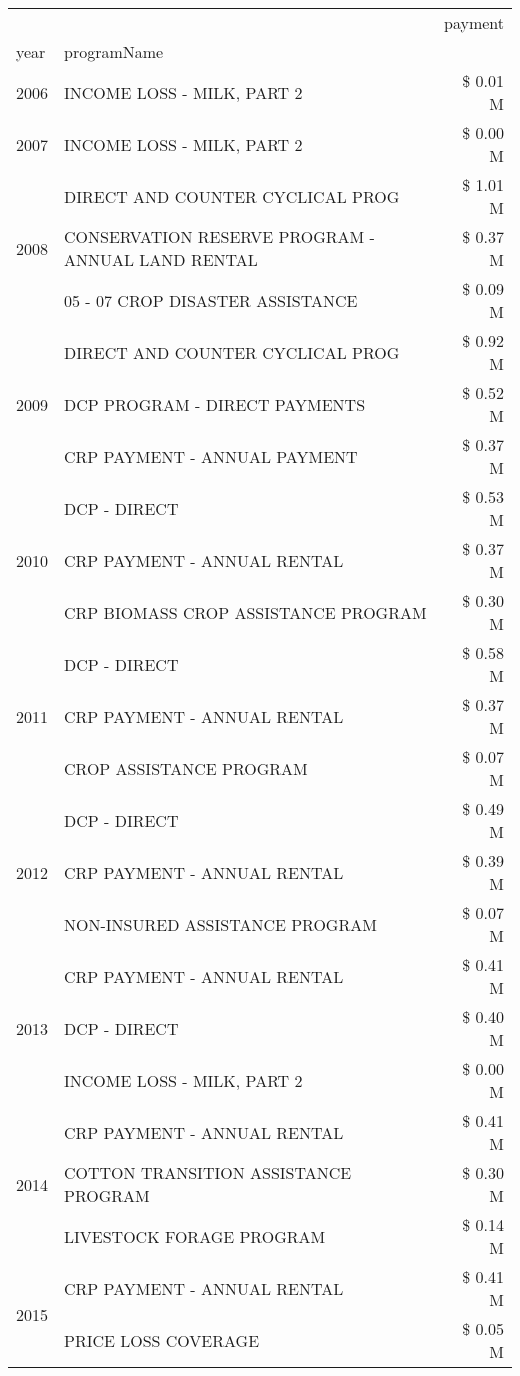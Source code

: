 \begin{tabular}{llr}
\toprule
 &  & payment \\
year & programName &  \\
\midrule
2006 & INCOME LOSS - MILK, PART 2 & \$ 0.01 M \\
\cline{1-3}
2007 & INCOME LOSS - MILK, PART 2 & \$ 0.00 M \\
\cline{1-3}
\multirow[t]{3}{*}{2008} & DIRECT AND COUNTER CYCLICAL PROG & \$ 1.01 M \\
 & CONSERVATION RESERVE PROGRAM - ANNUAL LAND RENTAL & \$ 0.37 M \\
 & 05 - 07 CROP DISASTER ASSISTANCE & \$ 0.09 M \\
\cline{1-3}
\multirow[t]{3}{*}{2009} & DIRECT AND COUNTER CYCLICAL PROG & \$ 0.92 M \\
 & DCP PROGRAM - DIRECT PAYMENTS & \$ 0.52 M \\
 & CRP PAYMENT - ANNUAL PAYMENT & \$ 0.37 M \\
\cline{1-3}
\multirow[t]{3}{*}{2010} & DCP - DIRECT & \$ 0.53 M \\
 & CRP PAYMENT - ANNUAL RENTAL & \$ 0.37 M \\
 & CRP BIOMASS CROP ASSISTANCE PROGRAM & \$ 0.30 M \\
\cline{1-3}
\multirow[t]{3}{*}{2011} & DCP - DIRECT & \$ 0.58 M \\
 & CRP PAYMENT - ANNUAL RENTAL & \$ 0.37 M \\
 & CROP ASSISTANCE PROGRAM & \$ 0.07 M \\
\cline{1-3}
\multirow[t]{3}{*}{2012} & DCP - DIRECT & \$ 0.49 M \\
 & CRP PAYMENT - ANNUAL RENTAL & \$ 0.39 M \\
 & NON-INSURED ASSISTANCE PROGRAM & \$ 0.07 M \\
\cline{1-3}
\multirow[t]{3}{*}{2013} & CRP PAYMENT - ANNUAL RENTAL & \$ 0.41 M \\
 & DCP - DIRECT & \$ 0.40 M \\
 & INCOME LOSS - MILK, PART 2 & \$ 0.00 M \\
\cline{1-3}
\multirow[t]{3}{*}{2014} & CRP PAYMENT - ANNUAL RENTAL & \$ 0.41 M \\
 & COTTON TRANSITION ASSISTANCE PROGRAM & \$ 0.30 M \\
 & LIVESTOCK FORAGE PROGRAM & \$ 0.14 M \\
\cline{1-3}
\multirow[t]{3}{*}{2015} & CRP PAYMENT - ANNUAL RENTAL & \$ 0.41 M \\
 & PRICE LOSS COVERAGE & \$ 0.05 M \\

\end{tabular}
